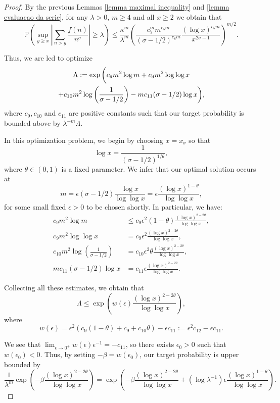 \documentclass[reqno0,12pt]{amsart}
\theoremstyle{remark}
\newcommand{\PP}{\mathbb{P}}
\begin{document}
\begin{proof}
By the previous Lemmas \ref{lemma maximal inequality} and \ref{lemma evaluacao da serie}, for any $\lambda>0$, $m\geq 4$ and all $x\geq 2$ we obtain that
$$\PP\left(\sup_{y\geq x}\left|\sum_{n>y}\frac{f(n)}{n^\sigma}\right|\geq \lambda\right)\leq \frac{\kappa^{m}}{\lambda^m}\left(\frac{c_7^m m^{c_5m}}{(\sigma-1/2)^{c_8m}}\frac{(\log x)^{c_5m}}{x^{2\sigma-1}}\right)^{m/2}.$$

Thus, we are led to optimize
\begin{multline*}
\Lambda:=\exp\bigg{(}c_9m^2\log m+c_9m^{2}\log\log x\\
+c_{10}m^2\log\left(\frac{1}{\sigma-1/2}\right)-mc_{11}(\sigma-1/2)\log x\bigg),
\end{multline*}
where $c_9,c_{10}$ and $c_{11}$ are positive constants such that our target probability is bounded above by $\lambda^{-m}\Lambda$.

In this optimization problem, we begin by choosing $x=x_\sigma$ so that 
\begin{equation}\label{equation auxiliar definition of x} 
\log x = \frac{1}{(\sigma-1/2)^{1/\theta}}, 
\end{equation} 
where $\theta\in(0,1)$ is a fixed parameter. We infer that our optimal solution occurs at
$$m= \epsilon(\sigma-1/2)\frac{\log x}{\log\log x }=\epsilon\frac{(\log x)^{1-\theta}}{\log\log x},$$
for some small fixed $\epsilon>0$ to be chosen shortly.
In particular, we have:
\begin{align*}
c_9m^2\log m &\leq c_9\epsilon^2(1-\theta)\frac{(\log x)^{2-2\theta}}{\log\log x}, \\
c_9m^2\log\log x&=c_9\epsilon^2\frac{(\log x)^{2-2\theta}}{\log\log x},\\
c_{10}m^2\log\left(\frac{1}{\sigma-1/2}\right)&=c_{10}\epsilon^2\theta\frac{(\log x)^{2-2\theta}}{\log\log x},\\
mc_{11}(\sigma-1/2)\log x&=c_{11}\epsilon\frac{(\log x)^{2-2\theta}}{\log\log x}.
\end{align*}

Collecting all these estimates, we obtain that
$$\Lambda\leq \exp\left(w(\epsilon)\frac{(\log x)^{2-2\theta}}{\log\log x}\right),$$
where 
$$w(\epsilon)=\epsilon^2( c_9(1-\theta)+c_9+c_{10}\theta)-\epsilon c_{11}:=\epsilon^2c_{12}-\epsilon c_{11}.$$

We see that $\lim_{\epsilon\to 0^+} w(\epsilon)\epsilon^{-1}=-c_{11}$, so there exists $\epsilon_0>0$ such that
$w(\epsilon_0)<0$. Thus, by setting $-\beta=w(\epsilon_0)$, our target probability is upper bounded
by
$$\frac{1}{\lambda^m}\exp\left(-\beta \frac{(\log x)^{2-2\theta}}{\log\log x}\right)=\exp\left(-\beta \frac{(\log x)^{2-2\theta}}{\log\log x}+(\log\lambda ^{-1})\epsilon\frac{(\log x)^{1-\theta}}{\log\log x} \right).$$
\end{proof}
\end{document}
